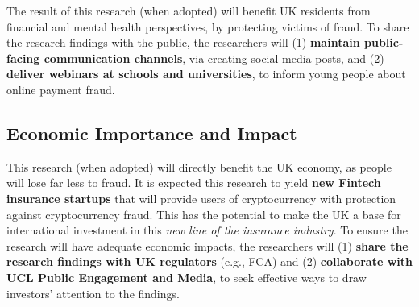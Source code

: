 The result of this research (when adopted) will benefit UK residents from financial and mental health perspectives, by protecting victims of fraud. To share the research findings with the public, the researchers will (1) \textbf{maintain public-facing communication channels}, via creating social media posts, and (2) \textbf{deliver webinars at schools and universities}, to inform young people about online payment fraud.   






\subsection{Economic Importance and Impact}
This research (when adopted) will directly benefit the UK economy, as people will lose far less to fraud. It is expected this research to yield \textbf{new Fintech insurance startups} that will provide users of cryptocurrency with protection against cryptocurrency fraud. This has the potential to make the UK a base for international investment in this \emph{new line of the insurance industry}. To ensure the research will have adequate economic impacts, the researchers will (1) \textbf{share the research findings with UK regulators} (e.g., FCA) and (2) \textbf{collaborate with UCL Public Engagement and Media}, to seek effective ways to draw investors' attention to the findings.



%
%
%

